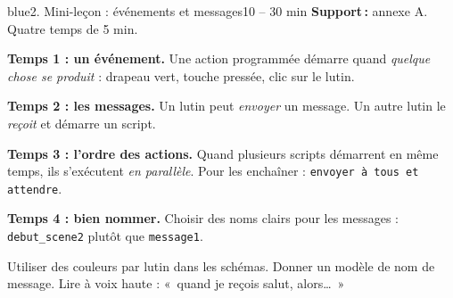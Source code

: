 \documentclass[11pt,a4paper]{article}
\begin{document}
\begin{etape}{blue}{2. Mini-leçon : événements et messages}{10 -- 30 min}
\textbf{Support\,:} annexe A. Quatre temps de 5 min.

\textbf{Temps 1 : un événement.} Une action programmée démarre quand \emph{quelque chose se produit} : drapeau vert, touche pressée, clic sur le lutin.

\textbf{Temps 2 : les messages.} Un lutin peut \emph{envoyer} un message. Un autre lutin le \emph{reçoit} et démarre un script.

\begin{center}
\end{center}

\textbf{Temps 3 : l'ordre des actions.} Quand plusieurs scripts démarrent en même temps, ils s'exécutent \emph{en parallèle}. Pour les enchaîner : \texttt{envoyer à tous et attendre}.

\textbf{Temps 4 : bien nommer.} Choisir des noms clairs pour les messages : \texttt{debut\_scene2} plutôt que \texttt{message1}.

\begin{astuce}
Utiliser des couleurs par lutin dans les schémas. Donner un modèle de nom de message. Lire à voix haute : «~quand je reçois salut, alors\ldots~»
\end{astuce}
\end{etape}
\end{document}

